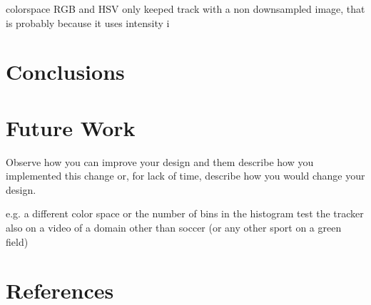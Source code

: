 \documentclass[a4paper,11pt]{article}
\begin{document}
colorspace RGB and HSV only keeped track with a non downsampled image,
that is probably because it uses intensity i


\section{Conclusions} \label{sec:conc}
\section{Future Work} \label{sec:fut}
Observe how you can improve your design and them describe how you implemented this change or, for lack of time, describe how you would change your design. 

e.g. a different color space or the number of bins in the histogram
test the tracker also on a video of a domain other than soccer (or any other sport on a green field)





\section{References} 


\renewcommand\bibname{References}


\end{document}
